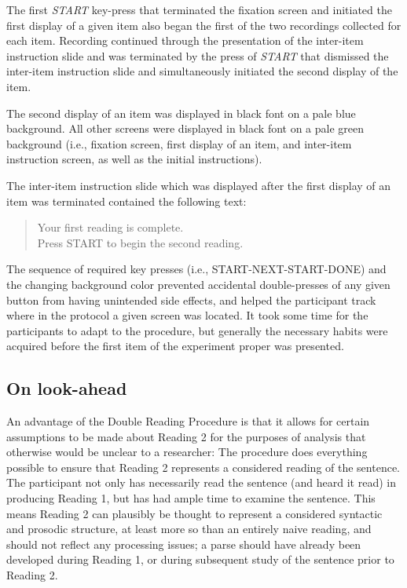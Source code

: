 \documentclass[11pt,oneside]{book}
\begin{document}
The first \emph{START} key-press that terminated the fixation screen and initiated the first display of a given item also began the first of the two recordings collected for each item. Recording continued through the presentation of the inter-item instruction slide and was terminated by the press of \emph{START} that dismissed the inter-item instruction slide and simultaneously initiated the second display of the item.

The second display of an item was displayed in black font on a pale blue background. All other screens were displayed in black font on a pale green background (i.e., fixation screen, first display of an item, and inter-item instruction screen, as well as the initial instructions).

The inter-item instruction slide which was displayed after the first display of an item was terminated contained the following text:

\begin{quotation}
Your first reading is complete.\\
Press START to begin the second reading.
\end{quotation}

The sequence of required key presses (i.e., START-NEXT-START-DONE) and the changing background color prevented accidental double-presses of any given button from having unintended side effects, and helped the participant track where in the protocol a given screen was located. It took some time for the participants to adapt to the procedure, but generally the necessary habits were acquired before the first item of the experiment proper was presented.

\hypertarget{look-ahead}{%
\subsection{On look-ahead}\label{look-ahead}}

An advantage of the Double Reading Procedure is that it allows for certain assumptions to be made about Reading 2 for the purposes of analysis that otherwise would be unclear to a researcher: The procedure does everything possible to ensure that Reading 2 represents a considered reading of the sentence. The participant not only has necessarily read the sentence (and heard it read) in producing Reading 1, but has had ample time to examine the sentence. This means Reading 2 can plausibly be thought to represent a considered syntactic and prosodic structure, at least more so than an entirely naive reading, and should not reflect any processing issues; a parse should have already been developed during Reading 1, or during subsequent study of the sentence prior to Reading 2.
\end{document}

